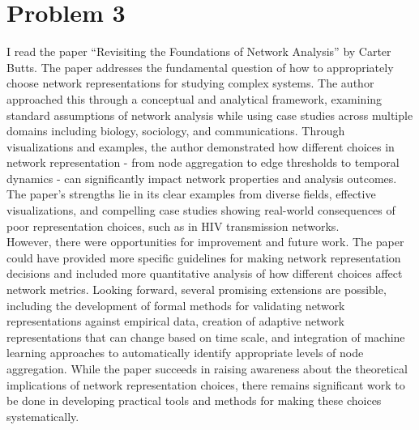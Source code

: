 \documentclass[12pt]{article}
\begin{document}
\section*{Problem 3}

I read the paper ``Revisiting the Foundations of Network Analysis'' by Carter Butts. The paper addresses the fundamental question of how to appropriately choose network representations for studying complex systems. The author approached this through a conceptual and analytical framework, examining standard assumptions of network analysis while using case studies across multiple domains including biology, sociology, and communications. Through visualizations and examples, the author demonstrated how different choices in network representation - from node aggregation to edge thresholds to temporal dynamics - can significantly impact network properties and analysis outcomes. The paper's strengths lie in its clear examples from diverse fields, effective visualizations, and compelling case studies showing real-world consequences of poor representation choices, such as in HIV transmission networks.\\

\noindent However, there were opportunities for improvement and future work. The paper could have provided more specific guidelines for making network representation decisions and included more quantitative analysis of how different choices affect network metrics. Looking forward, several promising extensions are possible, including the development of formal methods for validating network representations against empirical data, creation of adaptive network representations that can change based on time scale, and integration of machine learning approaches to automatically identify appropriate levels of node aggregation. While the paper succeeds in raising awareness about the theoretical implications of network representation choices, there remains significant work to be done in developing practical tools and methods for making these choices systematically.
\end{document}

